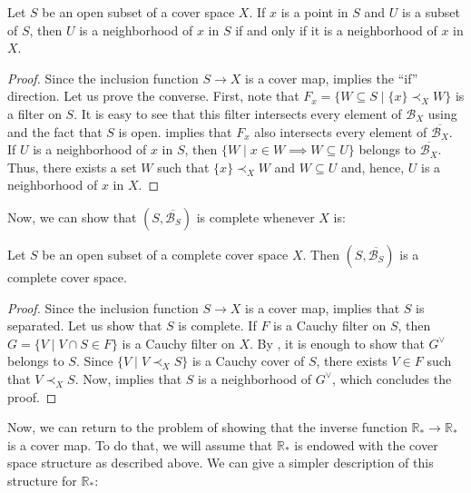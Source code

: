\documentclass[reqno]{amsart}
\theoremstyle{definition}
\theoremstyle{remark}
\numberwithin{figure}{section}
\newcommand{\rb}{\prec}
\begin{document}
\begin{lem}
Let $S$ be an open subset of a cover space $X$.
If $x$ is a point in $S$ and $U$ is a subset of $S$, then $U$ is a neighborhood of $x$ in $S$ if and only if it is a neighborhood of $x$ in $X$.
\end{lem}
\begin{proof}
Since the inclusion function $S \to X$ is a cover map,  implies the ``if'' direction.
Let us prove the converse.
First, note that $F_x = \{ W \subseteq S \mid \{ x \} \rb_X W \}$ is a filter on $S$.
It is easy to see that this filter intersects every element of $\mathcal{B}_X$ using  and the fact that $S$ is open.
 implies that $F_x$ also intersects every element of $\overline{\mathcal{B}_X}$.
If $U$ is a neighborhood of $x$ in $S$, then $\{ W \mid x \in W \implies W \subseteq U \}$ belongs to $\overline{\mathcal{B}_X}$.
Thus, there exists a set $W$ such that $\{ x \} \rb_X W$ and $W \subseteq U$ and, hence, $U$ is a neighborhood of $x$ in $X$.
\end{proof}

Now, we can show that $(S,\overline{\mathcal{B}_S})$ is complete whenever $X$ is:

\begin{prop}
Let $S$ be an open subset of a complete cover space $X$.
Then $(S,\overline{\mathcal{B}_S})$ is a complete cover space.
\end{prop}
\begin{proof}
Since the inclusion function $S \to X$ is a cover map,  implies that $S$ is separated.
Let us show that $S$ is complete.
If $F$ is a Cauchy filter on $S$, then $G = \{ V \mid V \cap S \in F \}$ is a Cauchy filter on $X$.
By , it is enough to show that $G^\vee$ belongs to $S$.
Since $\{ V \mid V \rb_X S \}$ is a Cauchy cover of $S$, there exists $V \in F$ such that $V \rb_X S$.
Now,  implies that $S$ is a neighborhood of $G^\vee$, which concludes the proof.
\end{proof}

Now, we can return to the problem of showing that the inverse function $\mathbb{R}_* \to \mathbb{R}_*$ is a cover map.
To do that, we will assume that $\mathbb{R}_*$ is endowed with the cover space structure as described above.
We can give a simpler description of this structure for $\mathbb{R}_*$:
\end{document}
